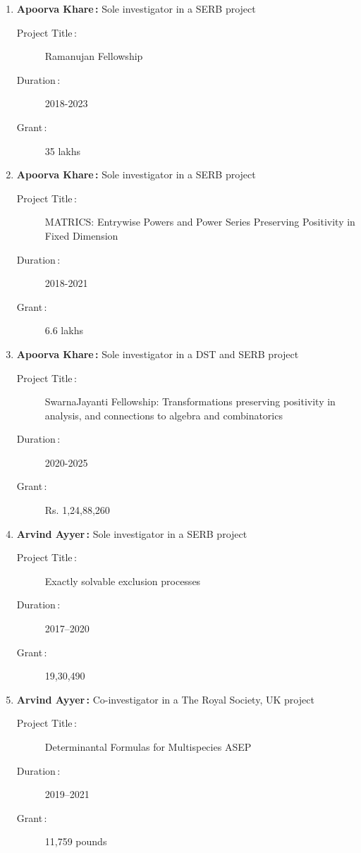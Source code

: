 \begin{enumerate}
\item {\bf Apoorva Khare\,:} Sole investigator in a SERB project
\begin{description}
  \item[Project Title\,:] Ramanujan Fellowship
  \item[Duration\,:] 2018-2023
  \item[Grant\,:] 35 lakhs
\end{description}


\item {\bf Apoorva Khare\,:} Sole investigator in a SERB project
\begin{description}
  \item[Project Title\,:] MATRICS: Entrywise Powers and Power Series Preserving Positivity in Fixed Dimension
  \item[Duration\,:] 2018-2021
  \item[Grant\,:] 6.6 lakhs
\end{description}


\item {\bf Apoorva Khare\,:} Sole investigator in a DST and SERB project
\begin{description}
  \item[Project Title\,:] SwarnaJayanti Fellowship: Transformations preserving positivity in analysis, and connections to algebra and combinatorics
  \item[Duration\,:] 2020-2025
  \item[Grant\,:] Rs. 1,24,88,260
\end{description}


\item {\bf Arvind Ayyer\,:} Sole investigator in a SERB project
\begin{description}
  \item[Project Title\,:] Exactly solvable exclusion processes
  \item[Duration\,:] 2017--2020
  \item[Grant\,:] 19,30,490
\end{description}


\item {\bf Arvind Ayyer\,:} Co-investigator in a The Royal Society, UK project
\begin{description}
  \item[Project Title\,:] Determinantal Formulas for Multispecies ASEP
  \item[Duration\,:] 2019--2021
  \item[Grant\,:] 11,759 pounds
\end{description}



\end{enumerate}
